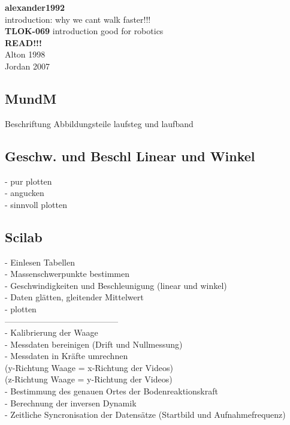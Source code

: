 \textbf{alexander1992}\\
introduction: why we cant walk faster!!!\\

\textbf{TLOK-069}
introduction good for robotics\\


\textbf{READ!!!}\\
Alton 1998\\
Jordan 2007\\


\subsection{MundM}
Beschriftung Abbildungsteile laufsteg und laufband
\subsection{Geschw. und Beschl Linear und Winkel}
- pur plotten\\
- angucken\\
- sinnvoll plotten\\


\subsection{Scilab}
- Einlesen Tabellen\\
- Massenschwerpunkte bestimmen\\
- Geschwindigkeiten und Beschleunigung (linear und winkel)\\
- Daten glätten, gleitender Mittelwert\\
- plotten\\
-----------------------------------------\\
- Kalibrierung der Waage\\
- Messdaten bereinigen (Drift und Nullmessung)\\
- Messdaten in Kräfte umrechnen\\
(y-Richtung Waage = x-Richtung der Videos)\\
(z-Richtung Waage = y-Richtung der Videos)\\
- Bestimmung des genauen Ortes der Bodenreaktionskraft\\
- Berechnung der inversen Dynamik\\
- Zeitliche Syncronisation der Datensätze (Startbild und Aufnahmefrequenz)\\
\clearpage

